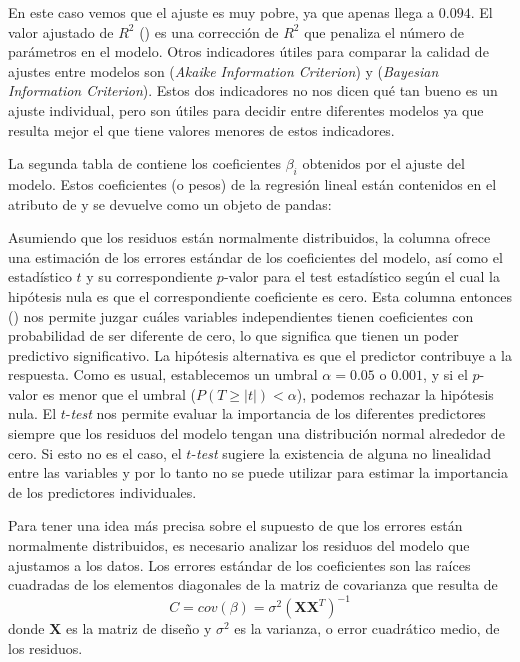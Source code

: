 
En este caso vemos que el ajuste es muy pobre, ya que apenas llega a $0.094$. El valor ajustado de $R^2$ () es una corrección de $R^2$ que penaliza el número de parámetros en el modelo. Otros indicadores útiles para comparar la calidad de ajustes entre modelos son  (\textit{Akaike Information Criterion}) y  (\textit{Bayesian Information Criterion}). Estos dos indicadores no nos dicen qué tan bueno es un ajuste individual, pero son útiles para decidir entre diferentes modelos ya que resulta mejor el que tiene valores menores de estos indicadores.

La segunda tabla de  contiene los coeficientes $\beta_i$ obtenidos por el ajuste del modelo. Estos coeficientes (o pesos) de la regresión lineal están contenidos en el atributo  de  y se devuelve como un objeto  de pandas:


Asumiendo que los residuos están normalmente distribuidos, la columna  ofrece una estimación de los errores estándar de los coeficientes del modelo, así como el estadístico $t$ y su correspondiente $p$-valor para el test estadístico según el cual la hipótesis nula es que el correspondiente coeficiente es cero. Esta columna entonces () nos permite juzgar cuáles variables independientes tienen coeficientes con probabilidad de ser diferente de cero, lo que significa que tienen un poder predictivo significativo. La hipótesis alternativa es que el predictor contribuye a la respuesta. Como es usual, establecemos un umbral $\alpha = 0.05$ o $0.001$, y si el $p$-valor es menor que el umbral ($P(T \geq |t|) < \alpha$), podemos rechazar la hipótesis nula. El $t$-\textit{test} nos permite evaluar la importancia de los diferentes predictores siempre que los residuos del modelo tengan una distribución normal alrededor de cero. Si esto no es el caso, el $t$-\textit{test} sugiere la existencia de alguna no linealidad entre las variables y por lo tanto no se puede utilizar para estimar la importancia de los predictores individuales.

Para tener una idea más precisa sobre el supuesto de que los errores están normalmente distribuidos, es necesario analizar los residuos del modelo que ajustamos a los datos. Los errores estándar de los coeficientes son las raíces cuadradas de los elementos diagonales de la matriz de covarianza que resulta de
\[ C = cov(\beta) = \sigma^2 (\bm{X} \bm{X}^T)^{-1} \]
donde $\bm{X}$ es la matriz de diseño y $\sigma^2$ es la varianza, o error cuadrático medio, de los residuos.


